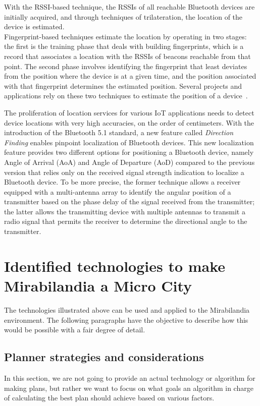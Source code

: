 With the RSSI-based technique, the RSSIs of all reachable Bluetooth devices are initially acquired, and through techniques of trilateration, the
location of the device is estimated.\\ Fingerprint-based techniques estimate the location by operating in two stages: the first is the training phase
that deals with building fingerprints, which is a record that associates a location with the RSSIs of beacons reachable from that point. The second
phase involves identifying the fingerprint that least deviates from the position where the device is at a given time, and the position associated
with that fingerprint determines the estimated position. Several projects and applications rely on these two techniques to estimate the position of a
device~\cite{mcconville2021vesta, samuel2021smart}.

The proliferation of location services for various IoT applications needs to detect device locations with very high accuracies, on the order of
centimeters. With the introduction of the Bluetooth 5.1 standard, a new feature called \textit{Direction Finding} enables pinpoint localization of
Bluetooth devices. This new localization feature provides two different options for positioning a Bluetooth device, namely Angle of Arrival (AoA) and
Angle of Departure (AoD) compared to the previous version that relies only on the received signal strength indication to localize a Bluetooth device.
To be more precise, the former technique allows a receiver equipped with a multi-antenna array to identify the angular position of a transmitter
based on the phase delay of the signal received from the transmitter; the latter allows the transmitting device with multiple antennas to transmit a
radio signal that permits the receiver to determine the directional angle to the transmitter.

\section{Identified technologies to make Mirabilandia a Micro City}
The technologies illustrated above can be used and applied to the Mirabilandia environment.
The following paragraphs have the objective to describe how this would be possible with a fair degree of detail.
\subsection{Planner strategies and considerations}
In this section, we are not going to provide an actual technology or algorithm for making plans, but rather we want to focus on what goals an
algorithm in charge of calculating the best plan should achieve based on various factors.

